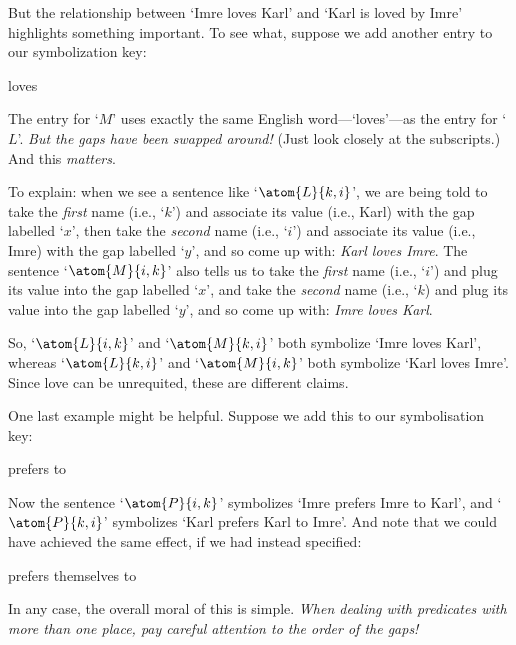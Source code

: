 But the relationship between `Imre loves Karl' and `Karl is loved by Imre' highlights something important. To see what, suppose we add another entry to our symbolization key:
\begin{ekey}
	\item[\atom{M}{x,y}]  loves 
\end{ekey}
The entry for `$M$' uses exactly the same English word---`loves'---as the entry for `$L$'. \emph{But the gaps have been swapped around!} (Just look closely at the subscripts.) And this \emph{matters}.

To explain: when we see a sentence like `$\atom{L}{k,i}$', we are being told to take the \emph{first} name (i.e., `$k$') and associate its value (i.e., Karl) with the gap labelled `$x$', then take the \emph{second} name (i.e., `$i$') and associate its value (i.e., Imre) with the gap labelled `$y$', and so come up with: \emph{Karl loves Imre}. The sentence `$\atom{M}{i,k}$' also tells us to take the \emph{first} name (i.e., `$i$') and plug its value into the gap labelled `$x$', and take the \emph{second} name (i.e., `$k$) and plug its value into the gap labelled `$y$', and so come up with: \emph{Imre loves Karl}.

So, `$\atom{L}{i,k}$' and `$\atom{M}{k,i}$' both symbolize `Imre loves Karl', whereas `$\atom{L}{k,i}$' and `$\atom{M}{i,k}$' both symbolize `Karl loves Imre'. Since love can be unrequited, these are different claims.

One last example might be helpful. Suppose we add this to our symbolisation key: 
\begin{ekey}
	\item[\atom{P}{x,y}]  prefers  to 
\end{ekey}
Now the sentence `$\atom{P}{i,k}$' symbolizes `Imre prefers Imre to Karl', and `$\atom{P}{k,i}$' symbolizes `Karl prefers Karl to Imre'.  And note that we could have achieved the same effect, if we had instead specified:
\begin{ekey}
	\item[\atom{P}{x,y}]  prefers themselves to 
\end{ekey}
In any case, the overall moral of this is simple. \emph{When dealing with predicates with more than one place, pay careful attention to the order of the gaps!} 


